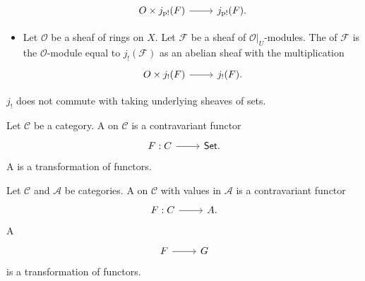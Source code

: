 \documentclass [11 pt, oneside] {article}
\begin{document}
\begin{definition}
\begin{itemize}
		\[
		\begin{tikzcd}
			\mathscr{O}\times j\sub{p!}(\mathscr{F}) \ar[r]& j\sub{p!}(\mathscr{F}).
		\end{tikzcd}
		\]
	\item Let $\mathscr{O}$ be a sheaf of rings on $X$. Let $\mathscr{F}$ be a sheaf of $\mathscr{O}\big|_{U}$-modules. The  of $\mathscr{F}$ is the $\mathscr{O}$-module equal to $j_{!}(\mathscr{F})$ as an abelian sheaf with the multiplication
		\[
		\begin{tikzcd}
			\mathscr{O}\times j_{!}(\mathscr{F}) \ar[r]& j_{!}(\mathscr{F}).
		\end{tikzcd}
		\]
		
\end{itemize}

\end{definition}

\begin{remark}
	$j_{!}$ does not commute with taking underlying sheaves of sets.
\end{remark}

\begin{definition}\label{}\text{}
Let $\mathscr{C}$ be a category.
A  on $\mathscr{C}$ is a contravariant functor
\[
\begin{tikzcd}
	\mathscr{F}:\mathscr{C}\ar[r]& \catn{Set}.
\end{tikzcd}
\]
A  is a transformation of functors.
\end{definition}

\begin{definition}\label{}\text{}
Let $\mathscr{C}$ and $\mathscr{A}$ be categories.
A  on $\mathscr{C}$ with values in $\mathscr{A}$ is a contravariant functor 
\[
\begin{tikzcd}
	\mathscr{F}:\mathscr{C}\ar[r]& \mathscr{A}.
\end{tikzcd}
\]
A  
\[
\begin{tikzcd}
	\mathscr{F}\ar[r]& \mathscr{G}
\end{tikzcd}
\]
is a transformation of functors.
\end{definition}
\end{document}

